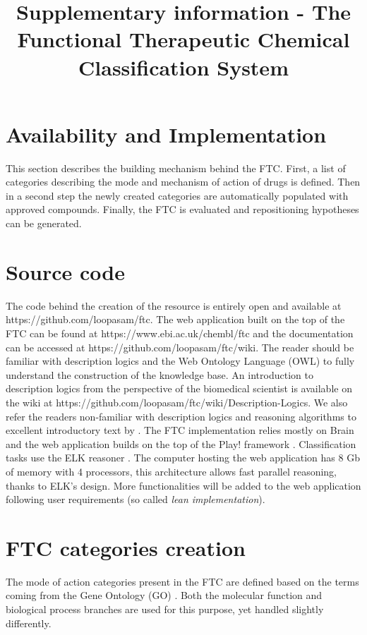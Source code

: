 \documentclass{bioinfo}
\begin{document}

\title[Supplementary information - The Functional Therapeutic Chemical Classification System]{Supplementary information - 
The Functional Therapeutic Chemical Classification System}

\section*{Availability and Implementation}

This section describes the building mechanism behind the FTC.
First, a list of categories describing the mode and mechanism of action of drugs is defined. 
Then in a second step the newly created categories are automatically populated with approved compounds. 
Finally, the FTC is evaluated and repositioning hypotheses can be generated.

\section{Source code}
The code behind the creation of the resource is entirely open and available 
at {{https://github.com/loopasam/ftc}}. The web application built on the top of the 
FTC can be found at {{https://www.ebi.ac.uk/chembl/ftc}} and the documentation can be 
accessed at {{https://github.com/loopasam/ftc/wiki}}. The reader should be familiar with 
description logics and the Web Ontology Language (OWL) to fully understand the construction of the 
knowledge base. An introduction to description logics from the perspective of the biomedical scientist is 
available on the wiki at {{https://github.com/loopasam/ftc/wiki/Description-Logics}}. We also refer the readers non-familiar
with description logics and reasoning algorithms to excellent introductory text by \cite{krotzsch2012description}.
The FTC implementation 
relies mostly on Brain \citep{Croset2013} and the web application builds on the top of the Play! framework \citep{playframework}. 
Classification tasks use the ELK reasoner \citep{Kazakov2011}. The computer hosting the web application has 8 Gb of memory 
with 4 processors, this architecture allows fast parallel reasoning, thanks to ELK's design. More functionalities 
will be added to the web application following user requirements (so called \emph{lean implementation}).

\section{FTC categories creation}
The mode of action categories present in the FTC are defined based on the terms coming from the 
Gene Ontology (GO) \citep{Ashburner2000}. Both the molecular function and biological process branches are used for 
this purpose, yet handled slightly differently.
\end{document}
